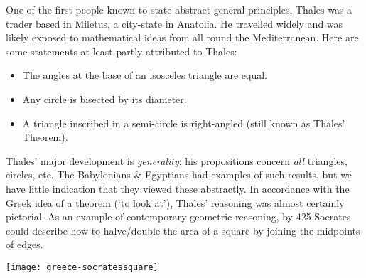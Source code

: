 \vspace{-5pt}


One of the first people known to state abstract general principles, Thales was a trader based in Miletus, a city-state in Anatolia. He travelled widely and was likely exposed to mathematical ideas from all round the Mediterranean. Here are some statements at least partly attributed to Thales:
\begin{itemize}\itemsep2pt
  \item The angles at the base of an isosceles triangle are equal.
  \item Any circle is bisected by its diameter.
  \item A triangle inscribed in a semi-circle is right-angled (still known as Thales' Theorem).
\end{itemize}


\begin{minipage}[t]{0.79\linewidth}\vspace{-10pt}
	Thales' major development is \emph{generality}: his propositions concern \emph{all} triangles, circles, etc. The Babylonians \& Egyptians had examples of such results, but we have little indication that they viewed these abstractly. In accordance with the Greek idea of a theorem (`to look at'), Thales' reasoning was almost certainly pictorial. As an example of contemporary geometric reasoning, by 425\BC{} Socrates could describe how to halve/double the area of a square by joining the midpoints of edges.
\end{minipage}
\hfill
\begin{minipage}[t]{0.2\linewidth}\vspace{-8pt}
  \flushright
  \texttt{[image: greece-socratessquare]}
\end{minipage}

\vspace{-5pt}





